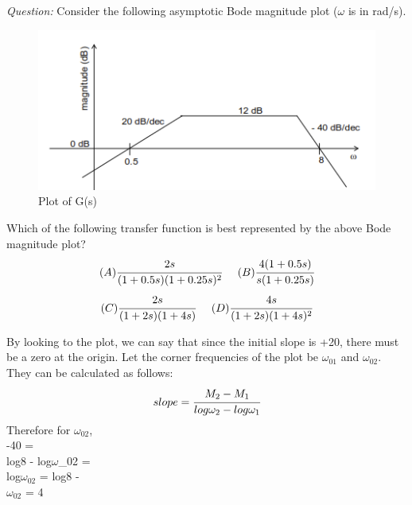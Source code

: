 \begin{enumerate}[label=\thesection.\arabic*.,ref=\thesection.\theenumi]

\textit{Question:} Consider the following asymptotic Bode magnitude plot ($\omega$ is in rad/s).
\begin{center}
      \begin{figure}[!h]
      \centering
      \includegraphics[width=\columnwidth]{./figs/ep18btech11016_fig1.png}
      \caption{Plot of G(s)}
      \label{fig:ep18btech11016_fig1}
      \end{figure}
\end{center}

Which of the following transfer function is best represented by the above Bode magnitude plot?
\begin{multline*}
    (A) \cfrac{2s}{(1+0.5s)(1+0.25s)^2}\hspace{0.5cm}
    (B) \cfrac{4(1+0.5s)}{s(1+0.25s)}
\end{multline*}
\begin{multline*}
    (C) \cfrac{2s}{(1+2s)(1+4s)}\hspace{0.5cm}
    (D) \cfrac{4s}{(1+2s)(1+4s)^2}
\end{multline*}

By looking to the plot, we can say that since the initial slope is +20, there must be a zero at the origin.
Let the corner frequencies of the plot be $\omega_{01}$ and $\omega_{02}$. They can be calculated as follows:
\begin{align*}
    slope = \cfrac{M_2 - M_1}{log\omega_2 - log\omega_1}\\
\end{align*}
Therefore for $\omega_{02}$,\\
-40 = \\
log8 - log$\omega$_{02} = \\
log$\omega_{02}$ = log8 - \\
$\omega_{02}$ = 4\\


\end{enumerate}
